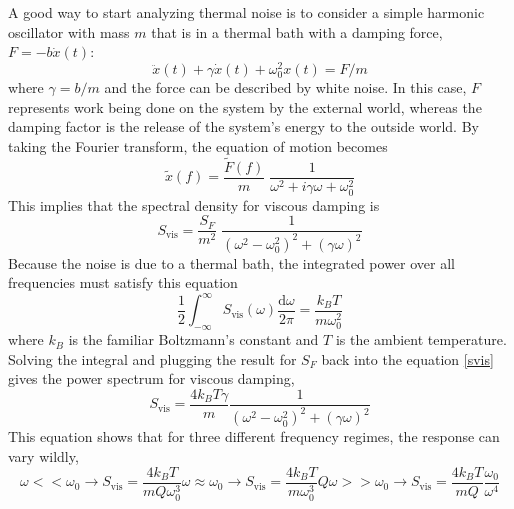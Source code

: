 		A good way to start analyzing thermal noise is to consider a simple harmonic oscillator with mass $m$ that is in a thermal bath with a damping force, $F=-b\dot{x}(t)$:
		\begin{equation}
		\ddot{x}(t) + \gamma \dot{x}(t) + \omega_{0}^2 x(t) = F/m
 		\end{equation}
		where $\gamma = b/m$ and the force can be described by white noise.  In this case, $F$ represents work being done on the system by the external world, whereas the damping factor is the release of the system's energy to the outside world.  By taking the Fourier transform, the equation of motion becomes
		\begin{equation}\label{harmonic}
		\tilde{x}(f) = \frac{\tilde{F}(f)}{m} \; \frac{1}{\omega^2 +i \gamma \omega + \omega_{0}^2} 
		\end{equation}
		This implies that the spectral density for viscous damping is
		\begin{equation}\label{svis}
		S_{\text{vis}} = \frac{S_F}{m^2} \; \frac{1}{(\omega^2 -\omega_{0}^2)^2 + (\gamma\omega)^2}
		\end{equation}
		Because the noise is due to a thermal bath, the integrated power over all frequencies must satisfy this equation
		\begin{equation}
		\frac{1}{2} \int_{-\infty}^{\infty} S_{\text{vis}} (\omega) \frac{\text{d}\omega}{2\pi} = \frac{k_B T}{m\omega_{0}^2}
		\end{equation}
		where $k_B$ is the familiar Boltzmann's constant and $T$ is the ambient temperature.  Solving the integral and plugging the result for $S_F$ back into the equation \ref{svis} gives the power spectrum for viscous damping,
		\begin{equation}\label{vis}
		S_{\text{vis}} = \frac{4k_B T \gamma}{m} \frac{1}{(\omega^2 - \omega_{0}^2)^2 + (\gamma\omega)^2}
		\end{equation}
		This equation shows that for three different frequency regimes, the response can vary wildly,
		\begin{subequations}
			\begin{equation}
			\omega<< \omega_{0} \rightarrow S_{\text{vis}} = \frac{4k_B T}{m Q \omega_{0}^3}
			\end{equation}
			\begin{equation}
			\omega \approx \omega_{0} \rightarrow S_{\text{vis}} = \frac{4k_B T}{m \omega_{0}^3} Q
			\end{equation}
			\begin{equation}
			\omega >> \omega_{0} \rightarrow S_{\text{vis}} = \frac{4k_B T}{m Q} \frac{\omega_0}{\omega^4} 
			\end{equation}
		\end{subequations}
